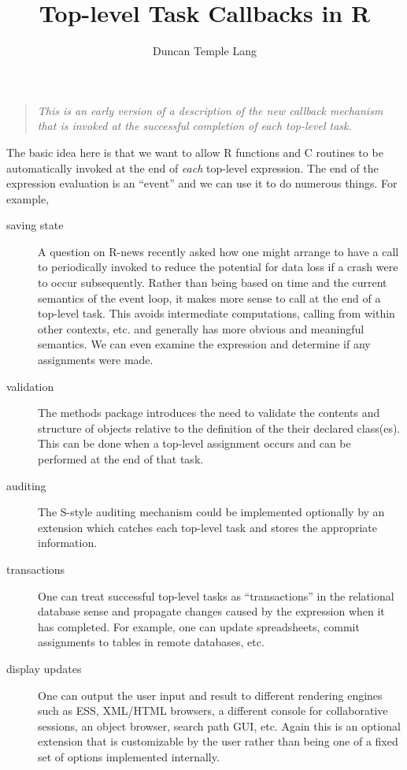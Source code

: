 \documentclass{article}
\title{Top-level Task Callbacks in R}
\author{Duncan Temple Lang}
\begin{document}
\maketitle

\begin{quote}
\textit{This is an early version of a description of the new callback
mechanism that is invoked at the successful completion of each
top-level task.}  
\end{quote}

The basic idea here is that we want to allow R functions and C
routines to be automatically invoked at the end of \textit{each}
top-level expression.  The end of the expression evaluation is an
``event'' and we can use it to do numerous things. For example,
\begin{description}
\item[saving state] A question on R-news recently asked how one might
  arrange to have a call to  periodically
  invoked to reduce
  the potential for data loss if a crash were to occur subsequently.
  Rather than being based on time and the current semantics of the
  event loop, it makes more sense to call  at
  the end of a top-level task.  This avoids intermediate computations,
  calling from within other contexts, etc.  and generally has more
  obvious and meaningful semantics.
  We can even examine the expression and  determine if any assignments
  were made.

\item[validation] The methods package introduces the need to validate
  the contents and structure of objects relative to the definition of
  the their declared class(es).  This can be done when a top-level
  assignment occurs and can be performed at the end of that task.

\item[auditing]
  The S-style auditing mechanism could be implemented optionally by 
an extension which catches each top-level task and stores
the appropriate information.

\item[transactions] One can treat successful top-level tasks as
  ``transactions'' in the relational database sense and propagate
  changes caused by the expression when it has completed.  For example, one
  can update spreadsheets, commit assignments to tables in remote
  databases, etc.

\item[display updates] One can output the user input and result to
  different rendering engines such as ESS, XML/HTML browsers, a different
  console for collaborative sessions, an object browser, search path
  GUI, etc.  Again this is an optional extension that is customizable
  by the user rather than being one of a fixed set of options
  implemented internally.
\end{description}
\end{document}
